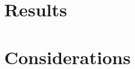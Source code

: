 \documentclass[11pt]{article}
\begin{document}

\section{Results}

\section{Considerations}




\end{document}
